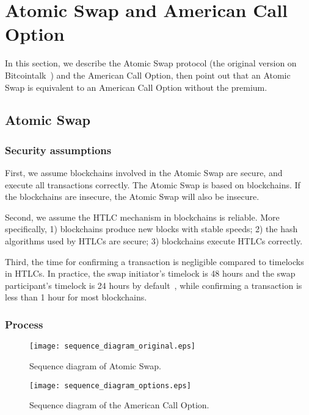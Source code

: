 \section{Atomic Swap and American Call Option}
\label{sec:formalization}

In this section, we describe the Atomic Swap protocol (the original version on Bitcointalk~\cite{nolan2013alt}) and the American Call Option,
then point out that an Atomic Swap is equivalent to an American Call Option without the premium.





\subsection{Atomic Swap}

\subsubsection{Security assumptions}

First, we assume blockchains involved in the Atomic Swap are secure, and execute all transactions correctly.
The Atomic Swap is based on blockchains.
If the blockchains are insecure, the Atomic Swap will also be insecure.

Second, we assume the HTLC mechanism in blockchains is reliable.
More specifically,
1) blockchains produce new blocks with stable speeds;
2) the hash algorithms used by HTLCs are secure;
3) blockchains execute HTLCs correctly.

Third, the time for confirming a transaction is negligible compared to timelocks in HTLCs.
In practice, the swap initiator's timelock is 48 hours and the swap participant's timelock is 24 hours by default~\cite{nolan2013alt}, while confirming a transaction is less than 1 hour for most blockchains.

\subsubsection{Process}


\begin{figure}[htp]
    \texttt{[image: sequence\_diagram\_original.eps]}
    \caption{Sequence diagram of Atomic Swap.}
    \label{fig:sequence_diagram_original}
\end{figure}

\begin{figure}[htp]
    \texttt{[image: sequence\_diagram\_options.eps]}
    \caption{Sequence diagram of the American Call Option.}
    \label{fig:sequence_diagram_option}
\end{figure}

